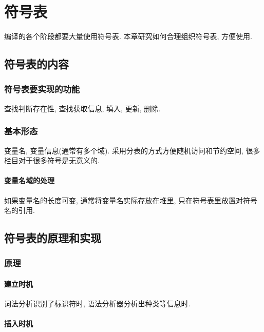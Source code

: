 \chapter{符号表}

    编译的各个阶段都要大量使用符号表. 本章研究如何合理组织符号表, 方便使用.

    \section{符号表的内容}

        \subsection{符号表要实现的功能} 
        
            查找判断存在性, 查找获取信息, 填入, 更新, 删除.

        \subsection{基本形态} 
        
            变量名, 变量信息(通常有多个域). 采用分表的方式方便随机访问和节约空间, 很多栏目对于很多符号是无意义的.

            \subsubsection{变量名域的处理}

                如果变量名的长度可变, 通常将变量名实际存放在堆里, 只在符号表里放置对符号名的引用.

    \section{符号表的原理和实现}

        \subsection{原理}

            \subsubsection{建立时机} 
            
                词法分析识别了标识符时, 语法分析器分析出种类等信息时.

            \subsubsection{插入时机}

